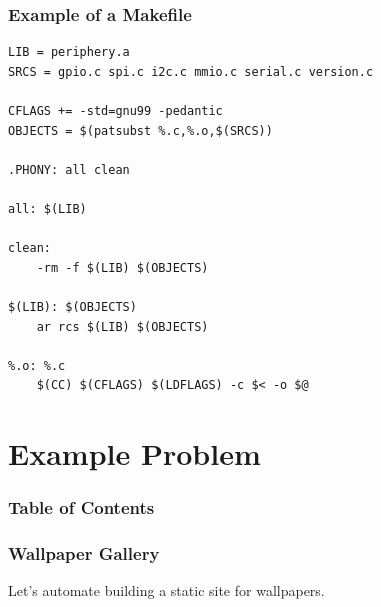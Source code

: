 \documentclass[xcolor=dvipsnames,t,compress]{beamer}
\begin{document}
\begin{frame}[fragile]
\frametitle{Example of a Makefile}
\vspace{-1.25em}
\begin{verbatim}
LIB = periphery.a
SRCS = gpio.c spi.c i2c.c mmio.c serial.c version.c

CFLAGS += -std=gnu99 -pedantic
OBJECTS = $(patsubst %.c,%.o,$(SRCS))

.PHONY: all clean

all: $(LIB)

clean:
	-rm -f $(LIB) $(OBJECTS)

$(LIB): $(OBJECTS)
	ar rcs $(LIB) $(OBJECTS)

%.o: %.c
	$(CC) $(CFLAGS) $(LDFLAGS) -c $< -o $@
\end{verbatim}
\end{frame}


\section{Example Problem}

\begin{frame}
\frametitle{Table of Contents}
\tableofcontents[currentsection]
\end{frame}

\begin{frame}
\frametitle{Wallpaper Gallery}
Let's automate building a static site for wallpapers.
\begin{center}
\end{center}
\end{frame}
\end{document}

